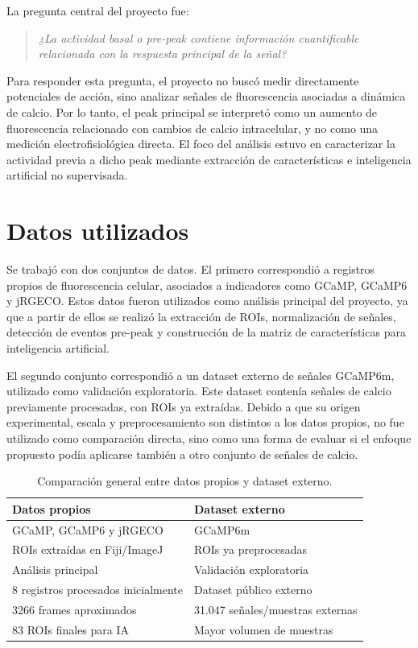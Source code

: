 \documentclass[10pt,twocolumn]{article}
\begin{document}
La pregunta central del proyecto fue:

\begin{quote}
\textit{¿La actividad basal o pre-peak contiene información cuantificable relacionada con la respuesta principal de la señal?}
\end{quote}

Para responder esta pregunta, el proyecto no buscó medir directamente potenciales de acción, sino analizar señales de fluorescencia asociadas a dinámica de calcio. Por lo tanto, el peak principal se interpretó como un aumento de fluorescencia relacionado con cambios de calcio intracelular, y no como una medición electrofisiológica directa. El foco del análisis estuvo en caracterizar la actividad previa a dicho peak mediante extracción de características e inteligencia artificial no supervisada.

\section{Datos utilizados}

Se trabajó con dos conjuntos de datos. El primero correspondió a registros propios de fluorescencia celular, asociados a indicadores como GCaMP, GCaMP6 y jRGECO. Estos datos fueron utilizados como análisis principal del proyecto, ya que a partir de ellos se realizó la extracción de ROIs, normalización de señales, detección de eventos pre-peak y construcción de la matriz de características para inteligencia artificial.

El segundo conjunto correspondió a un dataset externo de señales GCaMP6m, utilizado como validación exploratoria. Este dataset contenía señales de calcio previamente procesadas, con ROIs ya extraídas. Debido a que su origen experimental, escala y preprocesamiento son distintos a los datos propios, no fue utilizado como comparación directa, sino como una forma de evaluar si el enfoque propuesto podía aplicarse también a otro conjunto de señales de calcio.

\begin{table}[H]
\centering
\caption{Comparación general entre datos propios y dataset externo.}
\begin{tabular}{p{3.2cm}p{3.2cm}}
\toprule
\textbf{Datos propios} & \textbf{Dataset externo} \\
\midrule
GCaMP, GCaMP6 y jRGECO & GCaMP6m \\
ROIs extraídas en Fiji/ImageJ & ROIs ya preprocesadas \\
Análisis principal & Validación exploratoria \\
8 registros procesados inicialmente & Dataset público externo \\
3266 frames aproximados & 31.047 señales/muestras externas \\
83 ROIs finales para IA & Mayor volumen de muestras \\
\bottomrule
\end{tabular}
\end{table}
\end{document}
